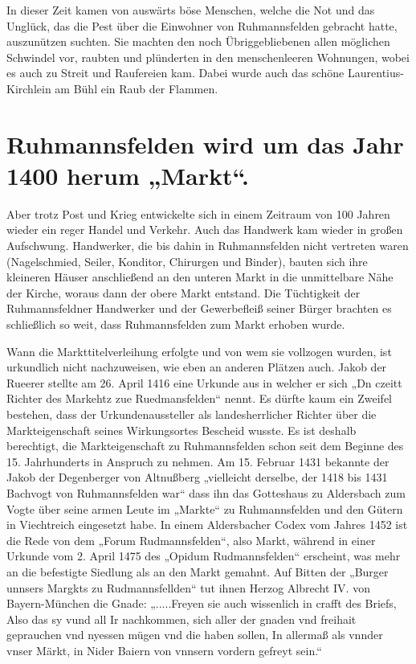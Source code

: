 \documentclass[12pt,a4paper]{book}
\begin{document}
In dieser Zeit kamen von auswärts böse Menschen, welche die Not und das
Unglück, das die Pest über die Einwohner von Ruhmannsfelden gebracht
hatte, auszunützen suchten. Sie machten den noch Übriggebliebenen allen
möglichen Schwindel vor, raubten und plünderten in den menschenleeren
Wohnungen, wobei es auch zu Streit und Raufereien kam. Dabei wurde auch
das schöne Laurentius-Kirchlein am Bühl ein Raub der Flammen.

\section{Ruhmannsfelden wird um das Jahr 1400 herum „Markt“.}

Aber trotz Post und Krieg entwickelte sich in einem Zeitraum von 100
Jahren wieder ein reger Handel und Verkehr. Auch das Handwerk kam wieder
in großen Aufschwung. Handwerker, die bis dahin in Ruhmannsfelden nicht
vertreten waren (Nagelschmied, Seiler, Konditor, Chirurgen und Binder),
bauten sich ihre kleineren Häuser anschließend an den unteren Markt in
die unmittelbare Nähe der Kirche, woraus dann der obere Markt entstand.
Die Tüchtigkeit der Ruhmannsfeldner Handwerker und der Gewerbefleiß
seiner Bürger brachten es schließlich so weit, dass Ruhmannsfelden zum
Markt erhoben wurde.

Wann die Markttitelverleihung erfolgte und von wem sie vollzogen wurden,
ist urkundlich nicht nachzuweisen, wie eben an anderen Plätzen auch.
Jakob der Rueerer stellte am 26. April 1416 eine Urkunde aus in welcher
er sich „Dn czeitt Richter des Markehtz zue Ruedmansfelden“ nennt. Es
dürfte kaum ein Zweifel bestehen, dass der Urkundenaussteller als
landesherrlicher Richter über die Markteigenschaft seines Wirkungsortes
Bescheid wusste. Es ist deshalb berechtigt, die Markteigenschaft zu
Ruhmannsfelden schon seit dem Beginne des 15. Jahrhunderts in Anspruch
zu nehmen. Am 15. Februar 1431 bekannte der Jakob der Degenberger von
Altnußberg „vielleicht derselbe, der 1418 bis 1431 Bachvogt von
Ruhmannsfelden war“ dass ihn das Gotteshaus zu Aldersbach zum Vogte über
seine armen Leute im „Markte“ zu Ruhmannsfelden und den Gütern in
Viechtreich eingesetzt habe. In einem Aldersbacher Codex vom Jahres 1452
ist die Rede von dem „Forum Rudmannsfelden“, also Markt, während in
einer Urkunde vom 2. April 1475 des „Opidum Rudmannsfelden“ erscheint,
was mehr an die befestigte Siedlung als an den Markt gemahnt. Auf Bitten
der „Burger unnsers Margkts zu Rudmannsfellden“ tut ihnen Herzog
Albrecht IV. von Bayern-München die Gnade: „.....Freyen sie auch
wissenlich in crafft des Briefs, Also das sy vund all Ir nachkommen,
sich aller der gnaden vnd freihait geprauchen vnd nyessen mügen vnd die
haben sollen, In allermaß als vnnder vnser Märkt, in Nider Baiern von
vnnsern vordern gefreyt sein.“
\end{document}
